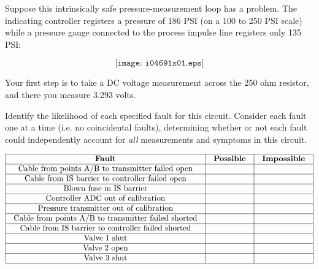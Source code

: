 

Suppose this intrinsically safe pressure-measurement loop has a problem.  The indicating controller registers a pressure of 186 PSI (on a 100 to 250 PSI scale) while a pressure gauge connected to the process impulse line registers only 135 PSI:

$$\texttt{[image: i04691x01.eps]}$$

Your first step is to take a DC voltage measurement across the 250 ohm resistor, and there you measure 3.293 volts.

\vskip 10pt

Identify the likelihood of each specified fault for this circuit.  Consider each fault one at a time (i.e. no coincidental faults), determining whether or not each fault could independently account for {\it all} measurements and symptoms in this circuit.


$$\vbox{\offinterlineskip
\halign{\strut
\vrule \quad\hfil # \ \hfil & 
\vrule \quad\hfil # \ \hfil & 
\vrule \quad\hfil # \ \hfil \vrule \cr
\noalign{\hrule}
%
{\bf Fault} & {\bf Possible} & {\bf Impossible} \cr
%
\noalign{\hrule}
%
Cable from points A/B to transmitter failed open &  &  \cr
%
\noalign{\hrule}
%
Cable from IS barrier to controller failed open &  &  \cr
%
\noalign{\hrule}
%
Blown fuse in IS barrier &  &  \cr
%
\noalign{\hrule}
%
Controller ADC out of calibration &  &  \cr
%
\noalign{\hrule}
%
Pressure transmitter out of calibration &  &  \cr
%
\noalign{\hrule}
%
Cable from points A/B to transmitter failed shorted &  &  \cr
%
\noalign{\hrule}
%
Cable from IS barrier to controller failed shorted &  &  \cr
%
\noalign{\hrule}
%
Valve 1 shut &  &  \cr
%
\noalign{\hrule}
%
Valve 2 open &  &  \cr
%
\noalign{\hrule}
%
Valve 3 shut &  &  \cr
%
\noalign{\hrule}
} %
}$$ %







